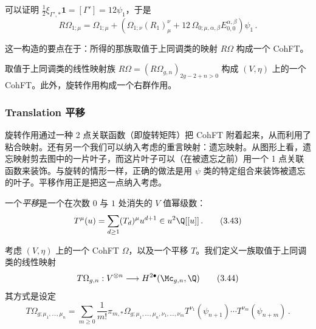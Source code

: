 \begin{itemize}
\begin{equation}
  \tag{3.41}
\end{equation}
可以证明 $\frac{1}{2}\xi_{\Gamma',*}\mathbf{1}=[\Gamma']=12\psi_{1}$，于是
\begin{equation}
  R\Omega_{1;\mu}=\Omega_{1;\mu}+\left(\Omega_{1;\nu}(R_{1})^{\nu}_{\mu}+12\,\Omega_{0;\mu,\alpha,\beta}E^{\alpha,\beta}_{0,0}\right)\psi_{1}\,.
  \tag{3.42}
\end{equation}
\end{itemize}

这一构造的要点在于：所得的那族取值于上同调类的映射 $R\Omega$ 构成一个 CohFT。

\begin{proposition}[3.4]
取值于上同调类的线性映射族 $R\Omega=(R\Omega_{g,n})_{2g-2+n>0}$ 构成 $(V,\eta)$ 上的一个 CohFT。此外，旋转作用构成一个右群作用。
\end{proposition}

\subsubsection{Translation 平移}

旋转作用通过一种 2 点关联函数（即旋转矩阵）把 CohFT 附着起来，从而利用了粘合映射。还有另一个我们可以纳入考虑的重言映射：遗忘映射。从图形上看，遗忘映射剪去图中的一片叶子，而这片叶子可以（在被遗忘之前）用一个 1 点关联函数来装饰。与旋转的情形一样，正确的做法是用 $\psi$ 类的特定组合来装饰被遗忘的叶子。平移作用正是把这一点纳入考虑。

一个\emph{平移}是一个在次数 $0$ 与 $1$ 处消失的 $V$ 值幂级数：
\begin{equation}
  T^{\mu}(u)=\sum_{d\ge1}(T_{d})^{\mu}u^{d+1}\in u^{2}\Q[[u]]\,.
  \tag{3.43}
\end{equation}

\begin{definition}[3.5]
考虑 $(V,\eta)$ 上的一个 CohFT $\Omega$，以及一个平移 $T$。我们定义一族取值于上同调类的线性映射
\begin{equation}
  T\Omega_{g,n}:V^{\otimes n}\longrightarrow H^{2\bullet}(\Mc_{g,n},\Q)
  \tag{3.44}
\end{equation}
其方式是设定
\begin{equation}
  T\Omega_{g;\mu_{1},\dots,\mu_{n}}=\sum_{m\ge0}\frac{1}{m!}\pi_{m,*}\Omega_{g;\mu_{1},\dots,\mu_{n},\nu_{1},\dots,\nu_{m}}T^{\nu_{1}}(\psi_{n+1})\cdots T^{\nu_{m}}(\psi_{n+m})\,.
  \tag{3.45}
\end{equation}
\end{definition}


